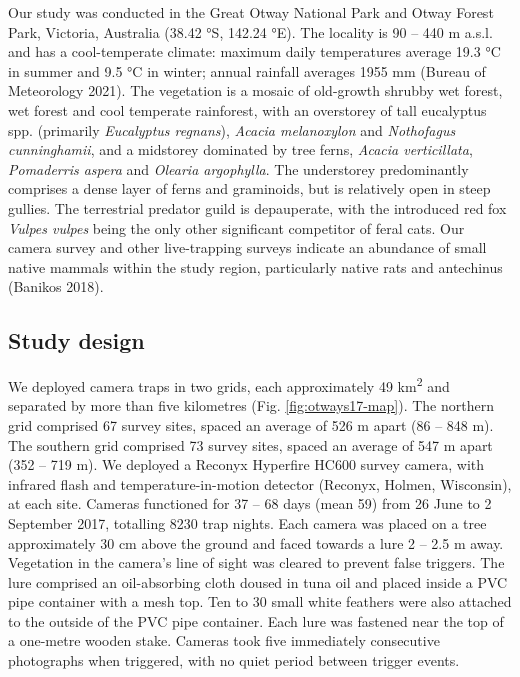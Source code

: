 \documentclass[11pt,a4paper,titlepage,twoside,openright]{style/unimelbthesis}
\begin{document}
\begin{mainmatter}
Our study was conducted in the Great Otway National Park and Otway Forest Park, Victoria, Australia (38.42 °S, 142.24 °E). The locality is 90 -- 440 m a.s.l. and has a cool-temperate climate: maximum daily temperatures average 19.3 °C in summer and 9.5 °C in winter; annual rainfall averages 1955 mm (Bureau of Meteorology 2021). The vegetation is a mosaic of old-growth shrubby wet forest, wet forest and cool temperate rainforest, with an overstorey of tall eucalyptus spp. (primarily \emph{Eucalyptus regnans}), \emph{Acacia melanoxylon} and \emph{Nothofagus cunninghamii}, and a midstorey dominated by tree ferns, \emph{Acacia verticillata}, \emph{Pomaderris aspera} and \emph{Olearia argophylla}. The understorey predominantly comprises a dense layer of ferns and graminoids, but is relatively open in steep gullies. The terrestrial predator guild is depauperate, with the introduced red fox \emph{Vulpes vulpes} being the only other significant competitor of feral cats. Our camera survey and other live-trapping surveys indicate an abundance of small native mammals within the study region, particularly native rats and antechinus (Banikos 2018).

\hypertarget{study-design}{%
\subsection{Study design}\label{study-design}}

We deployed camera traps in two grids, each approximately 49 km\textsuperscript{2} and separated by more than five kilometres (Fig. \ref{fig:otways17-map}). The northern grid comprised 67 survey sites, spaced an average of 526 m apart (86 -- 848 m). The southern grid comprised 73 survey sites, spaced an average of 547 m apart (352 -- 719 m). We deployed a Reconyx Hyperfire HC600 survey camera, with infrared flash and temperature-in-motion detector (Reconyx, Holmen, Wisconsin), at each site. Cameras functioned for 37 -- 68 days (mean 59) from 26 June to 2 September 2017, totalling 8230 trap nights. Each camera was placed on a tree approximately 30 cm above the ground and faced towards a lure 2 -- 2.5 m away. Vegetation in the camera's line of sight was cleared to prevent false triggers. The lure comprised an oil-absorbing cloth doused in tuna oil and placed inside a PVC pipe container with a mesh top. Ten to 30 small white feathers were also attached to the outside of the PVC pipe container. Each lure was fastened near the top of a one-metre wooden stake. Cameras took five immediately consecutive photographs when triggered, with no quiet period between trigger events.


\end{mainmatter}
\end{document}
